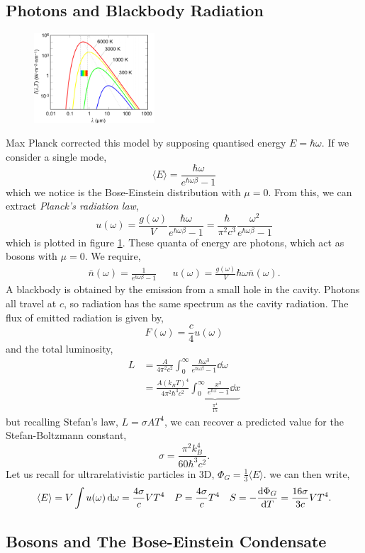 \documentclass{book}
\begin{document}
\subsection{Photons and Blackbody Radiation}
\begin{figure}[h]
	\centering
	\includegraphics[width=0.4\textwidth]{planck.png}
	\caption{}
	\label{fig:plank}
\end{figure}
Max Planck corrected this model by supposing quantised energy $E = \hbar \omega$. If we consider a single mode,
\begin{equation}
	\langle E \rangle = \frac{\hbar\omega}{e^{\hbar\omega\beta} - 1}
\end{equation}
which we notice is the Bose-Einstein distribution with $\mu = 0$. From this, we can extract \textit{Planck's radiation law},
\begin{equation}
	u(\omega) = \frac{g(\omega)}{V}\frac{\hbar\omega}{e^{\hbar \omega \beta} - 1} = \frac{\hbar}{\pi^2 c^3}\frac{\omega^2}{e^{\hbar\omega\beta} -1}
\end{equation}
which is plotted in figure \ref{fig:plank}. These quanta of energy are photons, which act as bosons with $\mu = 0$. We require,
\begin{align}
	\bar{n}(\omega) = \frac{1}{e^{\hbar\omega\beta}-1} && u(\omega) = \frac{g(\omega)}{V}\hbar\omega\bar{n}(\omega).
\end{align}
A blackbody is obtained by the emission from a small hole in the cavity. Photons all travel at $c$, so radiation has the same spectrum as the cavity radiation. The flux of emitted radiation is given by,
\begin{equation}
	F(\omega) = \frac{c}{4}u(\omega)
\end{equation}
and the total luminosity,
\begin{equation}
	\begin{split}
	L &= \frac{A}{4\pi^2c^2}\int_0^{\infty}\frac{\hbar\omega^3}{e^{\hbar\omega\beta}-1}\dd{\omega}\\
	&= \frac{A(k_BT)^4}{4\pi^2\hbar^3c^2}\underbrace{\int_0^{\infty}\frac{x^3}{e^{\hbar x} -1}\dd{x}}_{\frac{\pi^4}{15}}
	\end{split}
\end{equation}
but recalling Stefan's law, $L = \sigma A T^4$, we can recover a predicted value for the Stefan-Boltzmann constant,
\begin{equation}
	\sigma = \frac{\pi^2k_B^4}{60\hbar^3c^2}.
\end{equation}
Let us recall for ultrarelativistic particles in 3D, $\Phi_G= \frac{1}{3}\langle E \rangle$. we can then write,
\begin{align}
	\langle E \rangle = V\int u(\omega)\dd{\omega} = \frac{4\sigma}{c}VT^4 && P = \frac{4\sigma}{c}T^4 && S = -\dv{\Phi_G}{T} = \frac{16\sigma}{3c}VT^4.
\end{align}
\subsection{Bosons and The Bose-Einstein Condensate}
\end{document}
